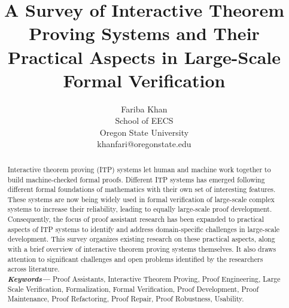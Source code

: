 \documentclass[11pt]{article}
\title{A Survey of Interactive Theorem Proving Systems and Their Practical Aspects in Large-Scale Formal Verification }
\author{Fariba Khan  \\
	School of EECS \\
	Oregon State University \\
	khanfari@oregonstate.edu
}
\date{}
\providecommand{\keywords}[1]{\textbf{\textit{Keywords---}} #1}
\begin{document}
	
	
\maketitle

\begin{abstract}
	
Interactive theorem proving (ITP) systems let human and machine work together to build machine-checked formal proofs. Different ITP systems has emerged following different formal foundations of mathematics with their own set of interesting features. These systems are now being widely used in formal verification of large-scale complex systems to increase their reliability, leading to equally large-scale proof development. Consequently, the focus of proof assistant research has been expanded to practical aspects of ITP systems to identify and address domain-specific challenges in large-scale development. This survey organizes existing research on these practical aspects, along with a brief overview of interactive theorem proving systems themselves. It also draws attention to significant challenges and open problems identified by the researchers across literature.\\

\keywords{Proof Assistants, Interactive Theorem Proving, Proof Engineering, Large Scale Verification, Formalization,
	Formal Verification, Proof Development, Proof Maintenance, Proof Refactoring, Proof Repair, Proof Robustness, Usability.}
	
\end{abstract}









\end{document}
